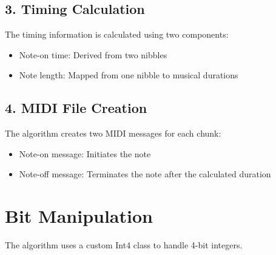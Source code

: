 \documentclass{article}
\begin{document}
\begin{center}
\end{center}

\subsection{3. Timing Calculation}
The timing information is calculated using two components:
\begin{itemize}
    \item Note-on time: Derived from two nibbles
    \item Note length: Mapped from one nibble to musical durations
\end{itemize}

\subsection{4. MIDI File Creation}
The algorithm creates two MIDI messages for each chunk:
\begin{itemize}
    \item Note-on message: Initiates the note
    \item Note-off message: Terminates the note after the calculated duration
\end{itemize}

\section{Bit Manipulation}
The algorithm uses a custom Int4 class to handle 4-bit integers.
\end{document}
